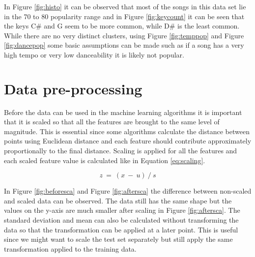 In Figure \ref{fig:histo} it can be observed that most of the songs in this data set lie in the 70 to 80 popularity range and in Figure \ref{fig:keycount} it can be seen that the keys C\# and G seem to be more common, while D\# is the least common. While there are no very distinct clusters, using Figure \ref{fig:temppop} and Figure \ref{fig:dancepop} some basic assumptions can be made such as if a song has a very high tempo or very low danceability it is likely not popular.

\section{Data pre-processing}
Before the data can be used in the machine learning algorithms it is important that it is scaled so that all the features are brought to the same level of magnitude. This is essential since some algorithms calculate the distance between points using Euclidean distance and each feature should contribute approximately proportionally to the final distance. Scaling is applied for all the features and each scaled feature value is calculated like in Equation \ref{eq:scaling}.

\begin{equation}
z\ =\ ( x\ -\ u) \ /\ s
\label{eq:scaling}
\end{equation}

In Figure \ref{fig:beforesca} and Figure \ref{fig:aftersca} the difference between non-scaled and scaled data can be observed. The data still has the same shape but the values on the y-axis are much smaller after scaling in Figure \ref{fig:aftersca}. The standard deviation and mean can also be calculated without transforming the data so that the transformation can be applied at a later point. This is useful since we might want to scale the test set separately but still apply the same transformation applied to the training data.

